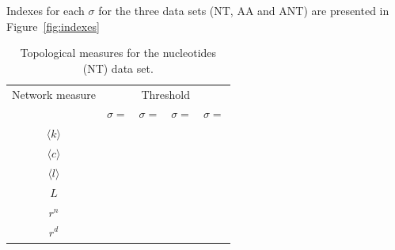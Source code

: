 \documentclass[12pt]{article}
\begin{document}
\newpage
Indexes for each $\sigma$ for the three data sets (NT, AA and ANT)  are presented in Figure~\ref{fig:indexes}
\begin{table}[!ht]
 \begin{center}
 \caption{\footnotesize Topological measures for the nucleotides (NT) data set.}
  \begin{tabular}{ccccc}
\toprule
  Network measure & \multicolumn{4}{c}{Threshold}\\
 & $\sigma=$& $\sigma=$& $\sigma=$&$\sigma=$\\
 \midrule
 $\langle k \rangle$ &     &          &          & \\
$\langle c \rangle$ &     &          &          & \\
$\langle l \rangle$ &     &          &          & \\ %
  $L$ &     &          &          & \\ %
$r^{n}$ &   &          &          & \\ %
$r^{d}$ &   &          &          & \\ %
\bottomrule
  \end{tabular}
 \end{center}
 \label{tab:indNT}
\end{table}
\end{document}
